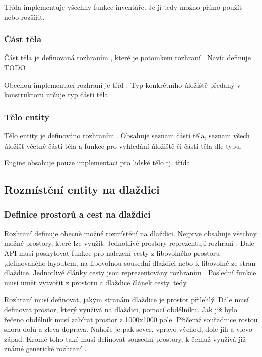 Třída  implementuje všechny funkce inventáře. Je jí tedy možno přímo použít nebo rozšířit.

\subsubsection{Část těla}
Část těla je definovaná rozhraním , které je potomkem rozhraní . Navíc definuje TODO

Obecnou implementací rozhraní je tříd . Typ konkrétního úložiště předaný v konstruktoru určuje typ části těla. 

\subsubsection{Tělo entity}
Tělo entity je definováno rozhraním .  Obsahuje seznam částí těla, seznam všech úložišť včetně částí těla a funkce pro vyhledání 
úložiště či části těla dle typu. 

Engine obsahuje pouze implementaci pro lidské tělo tj. třída 

\subsection{Rozmístění entity na dlaždici}
\subsubsection{Definice prostorů a cest na dlaždici}
Rozhraní  definuje obecně možné rozmístění na dlaždici. Nejprve obsahuje všechny možné prostory, které lze využít.
 Jednotlivě prostory reprezentují rozhraní . Dale API musí poskytovat funkce pro nalezení cesty z libovolného prostoru
 ,definovaného layoutem, na libovolnou sousední dlaždici nebo k libovolné ze stran dlaždice. Jednotlivé články cesty jsou 
 reprezentovány rozhraním . Poslední funkce musí umět vytvořit z prostoru a dlaždice článek cesty,
 tedy .  

Rozhraní  musí definovat, jakým stranám dlaždice je prostor přilehlý. Dále musí definovat prostor, který využívá
na dlaždici,  pomocí obdélníku. Jak již bylo řečeno obdélník musí zabírat prostor z 1000x1000 pole. Přičemž souřadnice rostou
shora dolů a zleva doprava. Nahoře je pak sever, vpravo východ, dole jih a vlevo západ. Kromě toho také musí definovat sousední
prostory, k čemuž využívá již známé generické rozhraní .

